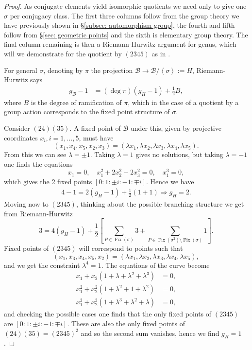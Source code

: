 \documentclass{amsart}
\newcommand{\psquare}[1]{\left[ #1 \right]}
\newcommand{\pangle}[1]{\left\langle #1 \right\rangle}
\begin{document}
\begin{proof}
As conjugate elements yield isomorphic quotients we need only to give one $\sigma$ per conjugacy class.  The first three columns follow from the group theory we have previously shown in \S\ref{subsec: automorphism group}, the fourth and fifth follow from \S\ref{sec: geometric points} and the sixth is elementary group theory. The final column remaining is then a Riemann-Hurwitz argument for genus, which will we demonstrate for the quotient by $(2345)$ as in \cite{Riera1992}.

For general $\sigma$, denoting by $\pi$ the projection $\mathcal{B} \to {\mathcal{B}}/{\pangle{\sigma}} := H$, Riemann-Hurwitz says 
\begin{align*}
g_\mathcal{B}-1 &= (\deg \pi )(g_H-1) + \frac{1}{2} B  , 
\end{align*}
where $B$ is the degree of ramification of $\pi$, which in the case of a quotient by a group action corresponds to the fixed point structure of $\sigma$.

Consider $(24)(35)$. A fixed point of $\mathcal{B}$ under this, given by projective coordinates $x_i,  i=1, \dots, 5$, must have 
\[
(x_1 , x_4 , x_5 , x_2 , x_3) = (\lambda x_1 , \lambda x_2 , \lambda x_3 , \lambda x_4 , \lambda x_5)  . 
\]
From this we can see $\lambda = \pm 1$. Taking $\lambda=1$ gives no solutions, but taking $\lambda=-1$ one finds the equations 
\[
x_1 = 0, \quad x_1^2 + 2x_2^2 + 2x_3^2 = 0, \quad x_1^3=0,
\]
which gives the 2 fixed points $[0:1:\pm i:-1:\mp i]$. Hence we have \begin{align*}
 4-1 = 2(g_H-1) + \frac{1}{2}(1+1)   
\Rightarrow  g_H = 2  . 
\end{align*}
Moving now to $(2 3 4 5)$, thinking about the possible branching structure we get from Riemann-Hurwitz 
\[
3 = 4(g_H-1) + \frac{1}{2} \psquare{\sum_{P \in \operatorname{Fix}(\sigma)} 3 + \sum_{P \in \operatorname{Fix}(\sigma^2)\setminus \operatorname{Fix}(\sigma)} 1}  . 
\]
Fixed points of $(2345)$ will correspond to points such that 
\[
(x_1 , x_3 , x_4 , x_5 , x_2) = (\lambda x_1 , \lambda x_2 , \lambda x_3 , \lambda x_4 , \lambda x_5)  , 
\]
and we get the constraint $\lambda^4=1$. The equations of the curve become 
\begin{align*}
    x_1 + x_2 (1+ \lambda + \lambda^2 + \lambda^3) &= 0  , \\
    x_1^2 + x_2^2 (1 + \lambda^2 + 1+ \lambda^2) &= 0  , \\
    x_1^3 + x_2^3(1 + \lambda^3 + \lambda^2 + \lambda) &= 0  , 
\end{align*}
and checking the possible cases one finds that the only fixed points of $(2345)$  are $[0:1:\pm i : -1: \mp i]$. These are also the only fixed points of $(24)(35) = (2345)^2$ and so the second sum vanishes, hence we find $g_H=1$.
\end{proof}
\end{document}

